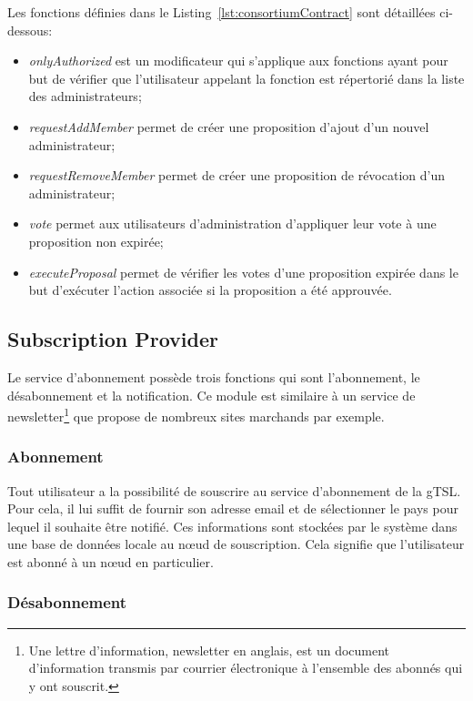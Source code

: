 \documentclass{tnreport}
\begin{document}
Les fonctions définies dans le Listing~\ref{lst:consortiumContract} sont détaillées ci-dessous:
\begin{itemize}
	\item \textit{onlyAuthorized} est un modificateur qui s'applique aux fonctions ayant pour but de vérifier que l'utilisateur appelant la fonction est répertorié dans la liste des administrateurs;
	\item \textit{requestAddMember} permet de créer une proposition d'ajout d'un nouvel administrateur;
	\item \textit{requestRemoveMember} permet de créer une proposition de révocation d'un administrateur;
	\item \textit{vote} permet aux utilisateurs d'administration d'appliquer leur vote à une proposition non expirée;
	\item \textit{executeProposal} permet de vérifier les votes d'une proposition expirée dans le but d'exécuter l'action associée si la proposition a été approuvée.
\end{itemize}

\subsection{Subscription Provider}

Le service d'abonnement possède trois fonctions qui sont l'abonnement, le désabonnement et la notification. Ce module est similaire à un service de newsletter\footnote{Une lettre d'information, newsletter en anglais, est un document d'information transmis par courrier électronique à l'ensemble des abonnés qui y ont souscrit.} que propose de nombreux sites marchands par exemple.

\subsubsection{Abonnement}

Tout utilisateur a la possibilité de souscrire au service d'abonnement de la gTSL. Pour cela, il lui suffit de fournir son adresse email et de sélectionner le pays pour lequel il souhaite être notifié. Ces informations sont stockées par le système dans une base de données locale au nœud de souscription. Cela signifie que l'utilisateur est abonné à un nœud en particulier.

\subsubsection{Désabonnement}
\end{document}
